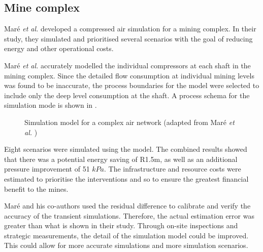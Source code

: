 \subsection{Mine complex}
Maré \textit{et al.} \cite{Mare2017Evaluating} developed a compressed air simulation for a mining complex. In their study, they simulated and prioritised several scenarios with the goal of reducing energy and other operational costs. 
\par
 Maré \textit{et al.} accurately modelled the individual compressors at each shaft in the mining complex. Since the detailed flow consumption at individual mining levels was found to be inaccurate, the process boundaries for the model were selected to include only the deep level consumption at the shaft. A process schema for the simulation mode is shown in .
 
 \begin{figure}[!htbp]
 	\centering
 	\caption[Simulation model for a complex air network]{Simulation model for a complex air network (adapted from Maré \textit{et al.} \cite{Mare2017Evaluating})}
 	\label{fig:Mare model}
 \end{figure}
\par 
 Eight scenarios were simulated using the model. The combined results showed that there was a potential energy saving of R1.5m, as well as an additional pressure improvement of 51 $kPa$. The infrastructure and resource costs were estimated to prioritise the interventions and so to ensure the greatest financial benefit to the mines.	
\par
	Maré and his co-authors used the residual difference to calibrate and verify the accuracy of the transient simulations. Therefore, the actual estimation error was greater than what is shown in their study. Through on-site inspections and strategic measurements, the detail of the simulation model could be improved. This could allow for more accurate simulations and more simulation scenarios.
